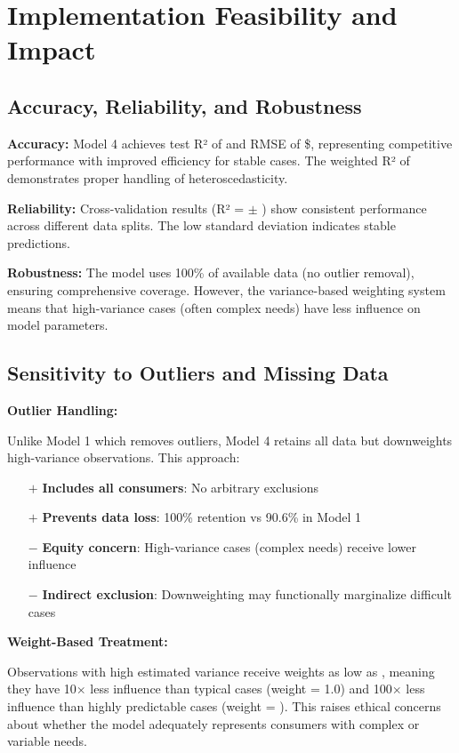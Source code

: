 \section{Implementation Feasibility and Impact}

\subsection{Accuracy, Reliability, and Robustness}

\textbf{Accuracy:} Model 4 achieves test R² of \ModelFourRSquaredTest{} and RMSE of \$\ModelFourRMSETest{}, representing competitive performance with improved efficiency for stable cases. The weighted R² of \ModelFourWeightedRSquared{} demonstrates proper handling of heteroscedasticity.

\textbf{Reliability:} Cross-validation results (R² = \ModelFourCVMean{} $\pm$ \ModelFourCVStd{}) show consistent performance across different data splits. The low standard deviation indicates stable predictions.

\textbf{Robustness:} The model uses 100\% of available data (no outlier removal), ensuring comprehensive coverage. However, the variance-based weighting system means that high-variance cases (often complex needs) have less influence on model parameters.

\subsection{Sensitivity to Outliers and Missing Data}

\textbf{Outlier Handling:}

Unlike Model 1 which removes outliers, Model 4 retains all data but downweights high-variance observations. This approach:
\begin{itemize}
    \item[$+$] \textbf{Includes all consumers}: No arbitrary exclusions
    \item[$+$] \textbf{Prevents data loss}: 100\% retention vs 90.6\% in Model 1
    \item[$-$] \textbf{Equity concern}: High-variance cases (complex needs) receive lower influence
    \item[$-$] \textbf{Indirect exclusion}: Downweighting may functionally marginalize difficult cases
\end{itemize}

\textbf{Weight-Based Treatment:}

Observations with high estimated variance receive weights as low as \ModelFourWeightMin{}, meaning they have 10$\times$ less influence than typical cases (weight = 1.0) and 100$\times$ less influence than highly predictable cases (weight = \ModelFourWeightMax{}). This raises ethical concerns about whether the model adequately represents consumers with complex or variable needs.

